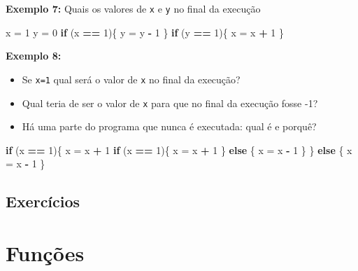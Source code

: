 \documentclass[
]{book}
\newenvironment{Shaded}{\begin{snugshade}}{\end{snugshade}}
\newcommand{\ControlFlowTok}[1]{\textcolor[rgb]{0.13,0.29,0.53}{\textbf{#1}}}
\newcommand{\DecValTok}[1]{\textcolor[rgb]{0.00,0.00,0.81}{#1}}
\newcommand{\NormalTok}[1]{#1}
\newcommand{\OtherTok}[1]{\textcolor[rgb]{0.56,0.35,0.01}{#1}}
\newcommand{\SpecialCharTok}[1]{\textcolor[rgb]{0.81,0.36,0.00}{\textbf{#1}}}
\begin{document}
\textbf{Exemplo 7:} Quais os valores de \texttt{x} e \texttt{y} no final da execução

\begin{Shaded}
\begin{Highlighting}[]
\NormalTok{x }\OtherTok{=} \DecValTok{1}
\NormalTok{y }\OtherTok{=} \DecValTok{0}
\ControlFlowTok{if}\NormalTok{ (x }\SpecialCharTok{==} \DecValTok{1}\NormalTok{)\{  }
\NormalTok{  y }\OtherTok{=}\NormalTok{ y }\SpecialCharTok{{-}} \DecValTok{1}
\NormalTok{\}}
\ControlFlowTok{if}\NormalTok{ (y }\SpecialCharTok{==} \DecValTok{1}\NormalTok{)\{  }
\NormalTok{  x }\OtherTok{=}\NormalTok{ x }\SpecialCharTok{+} \DecValTok{1}
\NormalTok{\}}
\end{Highlighting}
\end{Shaded}

\textbf{Exemplo 8:}

\begin{itemize}
\item
  Se \texttt{x=1} qual será o valor de \texttt{x} no final da execução?
\item
  Qual teria de ser o valor de \texttt{x} para que no final da execução fosse -1?
\item
  Há uma parte do programa que nunca é executada: qual é e porquê?
\end{itemize}

\begin{Shaded}
\begin{Highlighting}[]
\ControlFlowTok{if}\NormalTok{ (x }\SpecialCharTok{==} \DecValTok{1}\NormalTok{)\{  }
\NormalTok{  x }\OtherTok{=}\NormalTok{ x }\SpecialCharTok{+} \DecValTok{1}  
  \ControlFlowTok{if}\NormalTok{ (x }\SpecialCharTok{==} \DecValTok{1}\NormalTok{)\{    }
\NormalTok{    x }\OtherTok{=}\NormalTok{ x }\SpecialCharTok{+} \DecValTok{1}  
\NormalTok{  \} }\ControlFlowTok{else}\NormalTok{ \{   }
\NormalTok{      x }\OtherTok{=}\NormalTok{ x }\SpecialCharTok{{-}} \DecValTok{1}  
\NormalTok{  \}}
\NormalTok{\} }\ControlFlowTok{else}\NormalTok{ \{  }
\NormalTok{    x }\OtherTok{=}\NormalTok{ x }\SpecialCharTok{{-}} \DecValTok{1}
\NormalTok{\}}
\end{Highlighting}
\end{Shaded}

\section{Exercícios}\label{exercuxedcios-4}

\chapter{Funções}\label{funuxe7uxf5es}
\end{document}
